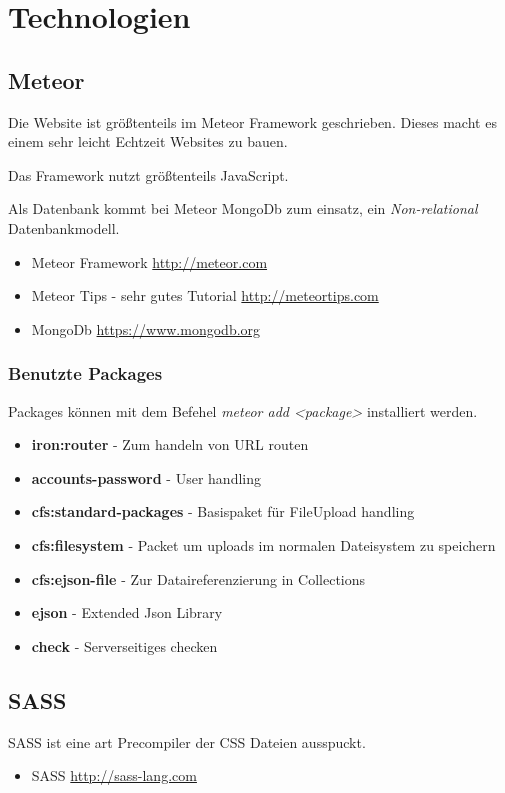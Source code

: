 \documentclass[Info_VK_Website_Dokumentation.tex]{subfiles}
\begin{document}
	
\chapter{Technologien}

\section{Meteor} 

Die Website ist größtenteils im Meteor Framework geschrieben. Dieses macht es einem sehr leicht Echtzeit Websites zu bauen.

Das Framework nutzt größtenteils JavaScript.

Als Datenbank kommt bei Meteor MongoDb zum einsatz, ein \emph{Non-relational} Datenbankmodell.

\begin{itemize}
 	\item Meteor Framework \url{http://meteor.com} \\
 	\item Meteor Tips - sehr gutes Tutorial \url{http://meteortips.com} \\
 	\item MongoDb \url{https://www.mongodb.org} \\ 
\end{itemize} 

\subsection{Benutzte Packages}

Packages können mit dem Befehel \emph{meteor add <package>} installiert werden.

\begin{itemize}
 	\item \textbf{iron:router} - Zum handeln von URL routen \\
 	\item \textbf{accounts-password} - User handling \\
 	\item \textbf{cfs:standard-packages} - Basispaket für FileUpload handling \\
 	\item \textbf{cfs:filesystem} - Packet um uploads im normalen Dateisystem zu speichern \\
 	\item \textbf{cfs:ejson-file} - Zur Dataireferenzierung in Collections \\
 	\item \textbf{ejson} - Extended Json Library \\
 	\item \textbf{check} - Serverseitiges checken \\
 \end{itemize} 

\section{SASS}

SASS ist eine art Precompiler der CSS Dateien ausspuckt.

\begin{itemize}
	\item SASS \url{http://sass-lang.com} 
\end{itemize}
\end{document}
